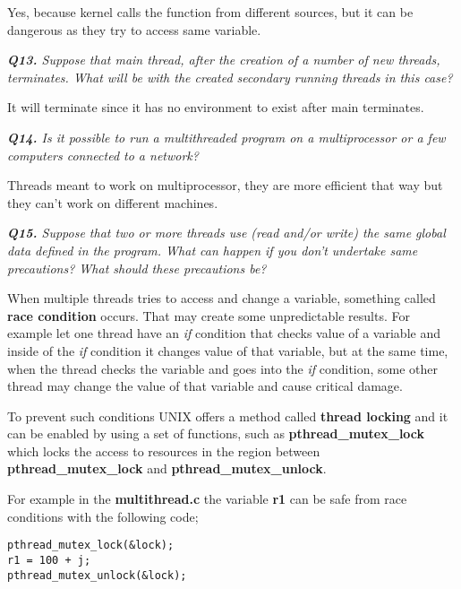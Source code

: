 \documentclass[11pt]{article}
\begin{document}
Yes, because kernel calls the function from different sources, but it can be dangerous as they try to access same variable.

\newpage
\vspace{5mm}
\textit{\textbf{Q13.} Suppose that main thread, after the creation of a number of new threads, terminates. What will be with the created secondary running threads in this case?}
\vspace{5mm}

It will terminate since it has no environment to exist after main terminates.

\vspace{5mm}
\textit{\textbf{Q14.} Is it possible to run a multithreaded program on a multiprocessor or a few computers connected to a network?}
\vspace{5mm}

Threads meant to work on multiprocessor, they are more efficient that way but they can't work on different machines.

\vspace{5mm}
\textit{\textbf{Q15.} Suppose that two or more threads use (read and/or write) the same global data defined in the program. What can happen if you don't undertake same precautions? What should these precautions be?}
\vspace{5mm}

When multiple threads tries to access and change a variable, something called \textbf{race condition} occurs. That may create some unpredictable results. For example let one thread have an \textit{if} condition that checks value of a variable and inside of the \textit{if} condition it changes value of that variable, but at the same time, when the thread checks the variable and goes into the \textit{if} condition, some other thread may change the value of that variable and cause critical damage.

To prevent such conditions UNIX offers a method called \textbf{thread locking} and it can be enabled by using a set of functions, such as \textbf{pthread\_mutex\_lock} which locks the access to resources in the region between \textbf{pthread\_mutex\_lock} and \textbf{pthread\_mutex\_unlock}.

For example in the \textbf{multithread.c} the variable \textbf{r1} can be safe from race conditions with the following code;

\begin{lstlisting}[frame=tlrb]
pthread_mutex_lock(&lock);
r1 = 100 + j;
pthread_mutex_unlock(&lock);
\end{lstlisting}
\end{document}
